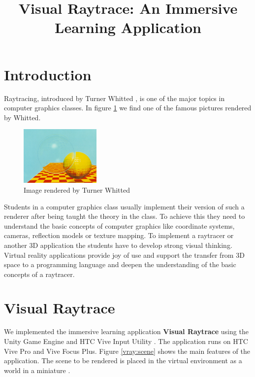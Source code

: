 \documentclass{VRARWorkshop}
\title{Visual Raytrace: An Immersive Learning Application}
\begin{document}

\section{Introduction}
Raytracing, introduced by Turner Whitted \cite{whitted_80}, is one of the major topics in
computer graphics classes.
In figure \ref{intro:whitted} we find one of the famous pictures rendered by Whitted.

\begin{figure}[h!]
    \begin{center}
        \includegraphics[width=0.35\textwidth]{whitted02.jpg}
        \caption{\label{intro:whitted} Image rendered by Turner Whitted \cite{checkerSpheres}}
    \end{center}
\end{figure}
Students in a computer graphics class usually implement their version of such a renderer
after being taught the theory in the class.
To achieve this they need to understand the basic concepts of computer graphics like coordinate systems,
cameras, reflection models or texture mapping. To implement a raytracer or another 3D application the students have to
develop strong visual thinking. Virtual reality applications provide joy of use and support the transfer
from 3D space to a programming language and deepen the understanding of the basic concepts of a raytracer.
%
\section{Visual Raytrace}
We implemented the immersive learning application \textbf{Visual Raytrace} \cite{saerota_21, visualraytrace} using the Unity Game Engine
and HTC Vive Input Utility \cite{viveInput}.
The application runs on HTC Vive Pro and Vive Focus Plus.
Figure \ref{vray:scene} shows the main features of the application.
The scene to be rendered is placed in the virtual environment as a world in a miniature \cite{pausch_95}.
\end{document}
